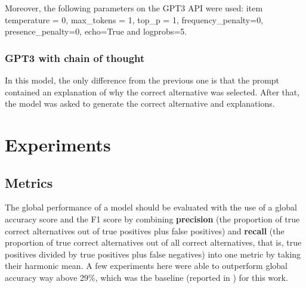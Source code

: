 \documentclass{article}
\begin{document}
Moreover, the following parameters on the GPT3 API were used: item temperature = 0, max\_tokens = 1, top\_p = 1, frequency\_penalty=0, presence\_penalty=0, echo=True and logprobs=5.

\subsubsection{\textbf{GPT3 with chain of thought}}

In this model, the only difference from the previous one is that the prompt contained an explanation of why the correct alternative was selected. After that, the model was asked to generate the correct alternative and explanations.




\section{Experiments}

\subsection{Metrics}

The global performance of a model should be evaluated with the use of a global accuracy score and the F1 score by combining \textbf{precision} (the proportion of true correct alternatives out of true positives plus false positives) and \textbf{recall} (the proportion of true correct alternatives out of all correct alternatives, that is, true positives divided by true positives plus false negatives) into one metric by taking their harmonic mean. A few experiments here were able to outperform global accuracy way above 29\%, which was the baseline (reported in \cite{8575587}) for this work.
\end{document}

